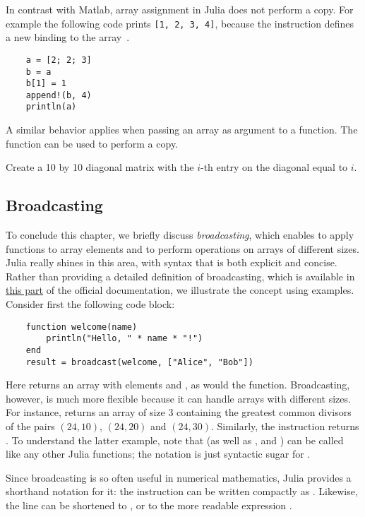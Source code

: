 In contrast with Matlab,
array assignment in Julia does not perform a copy.
For example the following code prints \texttt{[1, 2, 3, 4]},
because the instruction  defines a new binding to the array~.
\begin{verbatim}
    a = [2; 2; 3]
    b = a
    b[1] = 1
    append!(b, 4)
    println(a)
\end{verbatim}
A similar behavior applies when passing an array as argument to a function.
The  function can be used to perform a copy.

\begin{task}
    Create a 10 by 10 diagonal matrix with the $i$-th entry on the diagonal equal to $i$.
\end{task}

\subsection*{Broadcasting}%
\label{sub:broadcasting}
To conclude this chapter,
we briefly discuss \emph{broadcasting},
which enables to apply functions to array elements and to perform operations on arrays of different sizes.
Julia really shines in this area,
with syntax that is both explicit and concise.
Rather than providing a detailed definition of broadcasting,
which is available in \href{https://docs.julialang.org/en/v1/manual/arrays/#Broadcasting}{this part} of the official documentation,
we illustrate the concept using examples.
Consider first the following code block:
\begin{verbatim}
    function welcome(name)
        println("Hello, " * name * "!")
    end
    result = broadcast(welcome, ["Alice", "Bob"])
\end{verbatim}
Here  returns an array with elements  and ,
as would the  function.
Broadcasting, however, is much more flexible because it can handle arrays with different sizes.
For instance,  returns an array of size 3 containing the greatest common divisors of the pairs $(24, 10)$, $(24, 20)$ and $(24, 30)$.
Similarly, the instruction  returns \julia{[2, 3, 4]}.
To understand the latter example, note that \julia{+} (as well as \julia{*}, \julia{-} and \julia{/}) can be called like any other Julia functions;
the notation  is just syntactic sugar for .

Since broadcasting is so often useful in numerical mathematics,
Julia provides a shorthand notation for it: the instruction 
can be written compactly as .
Likewise, the line  can be shortened to ,
or to the more readable expression .

